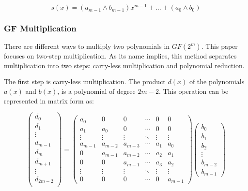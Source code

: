 \begin{equation}
 s(x) = (a_{m-1}\wedge b_{m-1})x^{m-1} + ... + (a_{0}\wedge b_{0})
 \label{eq:4}
\end{equation}


\subsubsection{GF Multiplication} \label{section:gf_mult}

There are different ways to multiply two polynomials in $GF(2^m)$. This paper focuses on two-step multiplication. As its name implies, 
this method separates multiplication into two steps: carry-less multiplication and polynomial reduction.


The first step is carry-less multiplication. The product $d(x)$ of the polynomials $a(x)$ and $b(x)$, is a polynomial of degree $2m-2$. 
This operation can be represented in matrix form as:

\begin{equation}
    \begin{pmatrix}
    d_{0} \\
    d_{1} \\
    \vdots \\
    d_{m-1} \\
    d_{m} \\
    d_{m+1} \\
    \vdots \\
    d_{2m-2} \\
    \end{pmatrix}
    =
    \begin{pmatrix}
        a_{0} & 0 & 0 & \cdots & 0 & 0 \\
        a_{1} & a_{0} & 0 & \cdots & 0 & 0 \\
        \vdots & \vdots & \vdots & \ddots & \vdots & \vdots \\
        a_{m-1} & a_{m-2} & a_{m-3} & \cdots & a_{1} & a_{0} \\
        0 & a_{m-1} & a_{m-2} & \cdots & a_{2} & a_{1} \\
        0 & 0 & a_{m-1} & \cdots & a_{3} & a_{2} \\
        \vdots & \vdots & \vdots & \ddots & \vdots & \vdots \\
        0 & 0 & 0 & \cdots & 0 & a_{m-1} 
    \end{pmatrix}
    \begin{pmatrix}
        b_{0} \\
        b_{1} \\
        b_{2} \\
        \vdots \\
        b_{m-2} \\
        b_{m-1} 
    \end{pmatrix}
\end{equation}

